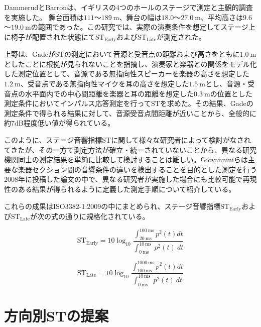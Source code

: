 \documentclass[11pt,a4j]{jreport}
\begin{document}
DammerudとBarron\cite{dammerud2007}は、イギリスの4つのホールのステージで測定と主観的調査を実施した。 舞台面積は$111$～$\SI{189}{\m}$、舞台の幅は$18.0$～$\SI{27.0}{\m}$、平均高さは$9.6$～$\SI{19.0}{\m}$の範囲であった。この研究では、実際の演奏条件を想定してステージ上に椅子が配置された状態にて$\mathrm{ST_{Early}}$および$\mathrm{ST_{Late}}$が測定された。

上野\cite{Ueno2002}は、Gadeが$\mathrm{ST}$の測定において音源と受音点の距離および高さをともに$\SI{1.0}{\m}$としたことに根拠が見られないことを指摘し、演奏家と楽器との関係をモデル化した測定位置として、音源である無指向性スピーカーを楽器の高さを想定した$\SI{1.2}{\m}$、受音点である無指向性マイクを耳の高さを想定した$\SI{1.5}{\m}$とし、音源・受音点の水平面内での中心間距離を楽器と耳の距離を想定した$\SI{0.3}{\m}$の位置とした測定条件においてインパルス応答測定を行ってSTを求めた。その結果、Gadeの測定条件で得られる結果に対して、音源受音点間距離が近いことから、全般的に約7dB程度低い値が得られている。

このように、ステージ音響指標STに関して様々な研究者によって検討がなされてきたが、その一方で測定方法が確立・統一されていないことから、異なる研究機関同士の測定結果を単純に比較して検討することは難しい。Giovannini\cite{giovannini2010}らは主要な楽器セクション間の音響条件の違いを検出することを目的とした測定を行う2008年に投稿した論文の中で、異なる研究者が実施した場合にも比較可能で再現性のある結果が得られるように定義した測定手順について紹介している。

これらの成果はISO3382-1:2009\cite{ISO3382-1}の中にまとめられ、ステージ音響指標$\mathrm{ST_{Early}}$および$\mathrm{ST_{Late}}$が次の式の通りに規格化されている。

\begin{equation}
  \label{eq:STEarly}
  \mathrm{ST_{Early}}= 10 \log_{10}
  \frac{\int_{20 \: \mathrm{ms}}^{100 \: \mathrm{ms}} p^2(t) dt}
  {\int_{0 \: \mathrm{ms}}^{10 \: \mathrm{ms}} \: p^2(t) \: dt}
\end{equation}

\begin{equation}
  \label{eq:STLate}
  \mathrm{ST_{Late}}= 10 \log_{10}
  \frac{\int_{100 \: \mathrm{ms}}^{1000 \: \mathrm{ms}} p^2(t) dt}
  {\int_{0 \: \mathrm{ms}}^{10 \: \mathrm{ms}} \: p^2(t) \: dt}
\end{equation}
\newpage
\section{方向別STの提案}
\end{document}
